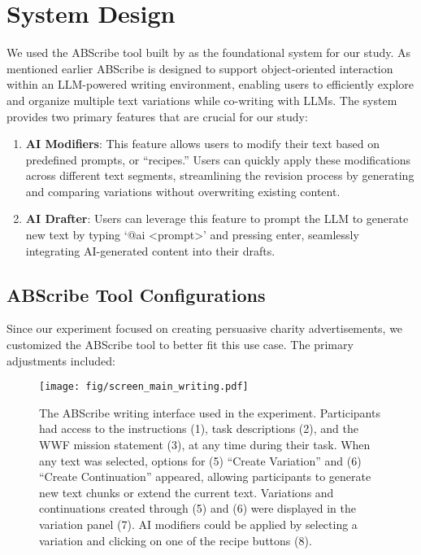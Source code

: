 \section{System Design}
We used the ABScribe tool built by \citet{Reza2023-hp} as the foundational system for our study. As mentioned earlier ABScribe is designed to support object-oriented interaction \cite{Kim2023-wn} 
within an LLM-powered writing environment, enabling users to efficiently explore and organize multiple text variations while co-writing with LLMs.
The system provides two primary features that are crucial for our study:
\begin{enumerate}
    \item \textbf{AI Modifiers}: This feature allows users to modify their text based on predefined prompts, or ``recipes.'' Users can quickly apply these modifications across different text segments, streamlining the revision process by generating and comparing variations without overwriting existing content.
    \item \textbf{AI Drafter}: Users can leverage this feature to prompt the LLM to generate new text by typing `@ai <prompt>' and pressing enter, seamlessly integrating AI-generated content into their drafts.
\end{enumerate}

\subsection{ABScribe Tool Configurations}
Since our experiment focused on creating persuasive charity advertisements, we customized the ABScribe tool to better fit this use case. The primary adjustments included:



\begin{figure}[!ht]
    \centering
    \texttt{[image: fig/screen\_main\_writing.pdf]}
       \caption{The ABScribe writing interface used in the experiment. Participants had access to the instructions (1), task descriptions (2), and the WWF mission statement (3), at any time during their task. When any text was selected, options for (5) ``Create Variation'' and (6) ``Create Continuation'' appeared, allowing participants to generate new text chunks or extend the current text. Variations and continuations created through (5) and (6) were displayed in the variation panel (7). AI modifiers could be applied by selecting a variation and clicking on one of the recipe buttons (8).}
    \label{fig:writing_screen}

\end{figure}

